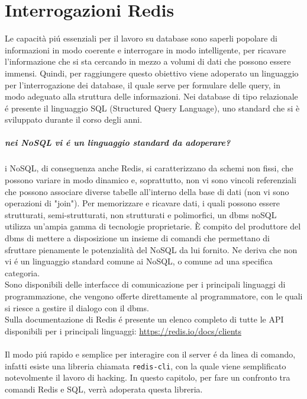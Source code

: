 \chapter{Interrogazioni Redis}
Le capacità piú essenziali per il lavoro su database sono saperli popolare di informazioni in modo coerente e interrogare in modo
intelligente, per ricavare l'informazione che si sta cercando in mezzo a volumi di dati che possono essere immensi.
Quindi, per raggiungere questo obiettivo viene adoperato un linguaggio per l'interrogazione dei database, il quale serve per formulare delle
query, in modo adeguato alla struttura delle informazioni.
Nei database di tipo relazionale é presente il linguaggio SQL (Structured Query Language), uno standard che si è sviluppato
durante il corso degli anni.

\paragraph{nei NoSQL vi é un linguaggio standard da adoperare?\\}
i NoSQL, di conseguenza anche Redis, si caratterizzano da schemi non fissi, che possono variare in modo dinamico e, soprattutto, non vi sono vincoli referenziali che possono associare
diverse tabelle all'interno della base di dati (non vi sono operazioni di "join").
Per memorizzare e ricavare dati, i quali possono essere strutturati, semi-strutturati, non strutturati e polimorfici, un dbms noSQL utilizza un'ampia gamma di
tecnologie proprietarie.
È compito del produttore del dbms di mettere a disposizione un insieme di comandi che permettano di sfruttare pienamente le potenzialità del NoSQL da lui fornito.
Ne deriva che non vi é un linguaggio standard comune ai NoSQL, o comune ad una specifica categoria.\\
Sono disponibili delle interfacce di comunicazione per i principali linguaggi di programmazione, che vengono
offerte direttamente al programmatore, con le quali si riesce a gestire il dialogo con il dbms.
\\
Sulla documentazione di Redis é presente un elenco completo di tutte le API disponibili per i principali linguaggi:
\url{https://redis.io/docs/clients}\\
\\
Il modo piú rapido e semplice per interagire con il server é da linea di comando, infatti esiste una libreria chiamata
\texttt{redis-cli}, con la quale viene semplificato notevolmente il lavoro di hacking.
In questo capitolo, per fare un confronto tra comandi Redis e SQL, verrà adoperata questa libreria.\\
